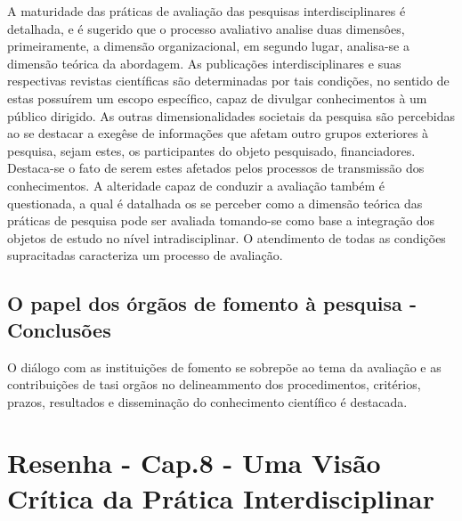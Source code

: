 \documentclass[
   article,       %
   12pt,          %
   oneside,       %
   a4paper,       %
   english,       %
   brazil,           %
   sumario=tradicional
   ]{abntex2}
\begin{document}
A maturidade das práticas de avaliação das pesquisas interdisciplinares é detalhada, e é sugerido que o processo avaliativo analise duas dimensôes, primeiramente, a dimensão organizacional, em segundo lugar, analisa-se a dimensão teórica da abordagem. As publicações interdisciplinares e suas respectivas revistas científicas são determinadas por tais condições, no sentido de estas possuírem um escopo específico, capaz de divulgar conhecimentos à um público dirigido. As outras dimensionalidades societais da pesquisa são percebidas ao se destacar a exegêse de informações que afetam outro grupos exteriores à pesquisa, sejam estes, os participantes do objeto pesquisado, financiadores. Destaca-se o fato de serem estes afetados pelos processos de transmissão dos conhecimentos. A alteridade capaz de conduzir a avaliação também é questionada, a qual é datalhada os se perceber como a dimensão teórica das práticas de pesquisa pode ser avaliada tomando-se como base a integração dos objetos de estudo no nível intradisciplinar. O atendimento de todas as condições supracitadas caracteriza um processo de avaliação.


\subsection{O papel dos órgãos de fomento à pesquisa - Conclusões}

O diálogo com as instituições de fomento se sobrepõe ao tema da avaliação e as contribuições de tasi orgãos no delineammento dos procedimentos, critérios, prazos, resultados  e disseminação do conhecimento científico é destacada.



\newpage

\section{Resenha - Cap.8 - Uma Visão Crítica da Prática Interdisciplinar}
\end{document}
